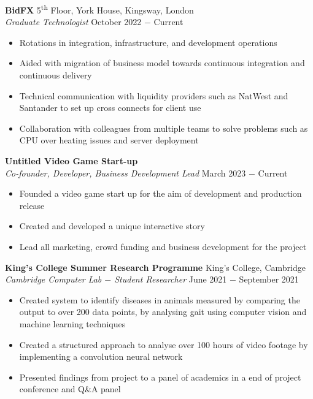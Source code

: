\documentclass{article}
\begin{document}
\textbf{BidFX} \hfill 5\textsuperscript{th} Floor, York House, Kingsway, London\\
\textit{Graduate Technologist} \hfill October 2022 $-$ Current
\begin{itemize}
    \item Rotations in integration, infrastructure, and development operations 
    \item Aided with migration of business model towards continuous integration and continuous delivery
    \item Technical communication with liquidity providers such as NatWest and Santander to set up cross connects for client use
    \item Collaboration with colleagues from multiple teams to solve problems such as CPU over heating issues and server deployment
\end{itemize} \medskip

\textbf{Untitled Video Game Start-up}\\
\textit{Co-founder, Developer, Business Development Lead} \hfill March 2023 $-$ Current
\begin{itemize}
    \item Founded a video game start up for the aim of development and production release
    \item Created and developed a unique interactive story
    \item Lead all marketing, crowd funding and business development for the project
\end{itemize} \medskip

\textbf{King's College Summer Research Programme} \hfill King's College, Cambridge \\
\textit{Cambridge Computer Lab $-$ Student Researcher} \hfill June 2021 $-$ September 2021
\begin{itemize}
    \item Created system to identify diseases in animals measured by comparing the output to over 200 data points, by analysing gait using computer vision and machine learning techniques
    \item Created a structured approach to analyse over 100 hours of video footage by implementing a convolution neural network 
    \item Presented findings from project to a panel of academics in a end of project conference and Q\&A panel
\end{itemize} \medskip
\end{document}
